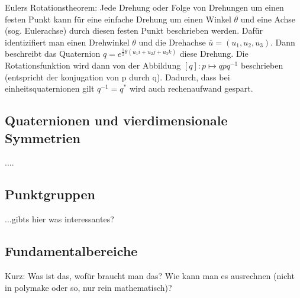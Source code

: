 Eulers Rotationstheorem: Jede Drehung oder Folge von Drehungen um einen festen Punkt kann für eine einfache Drehung um einen Winkel $\theta$ und eine Achse (sog. Eulerachse) durch diesen festen Punkt beschrieben werden. Dafür identizifiert man einen 
Drehwinkel $\theta$ und die Drehachse $\overline{u} = (u_1,u_2,u_3)$.
Dann beschreibt das Quaternion $q = e^{\frac{1}{2}\theta(u_1i + u_2j + u_3k)}$ diese Drehung.
Die Rotationsfunktion wird dann von der Abbildung $[q]: p \mapsto q p q^{-1}$ beschrieben (entspricht der konjugation von p durch q).
Dadurch, dass bei einheitsquaternionen gilt $q^{-1} = q^*$ wird auch rechenaufwand gespart.

\subsection{Quaternionen und vierdimensionale Symmetrien}
....

\subsection{Punktgruppen}
...gibts hier was interessantes?

\subsection{Fundamentalbereiche}
Kurz: Was ist das, wofür braucht man das? Wie kann man es ausrechnen (nicht in polymake oder so, nur rein mathematisch)?
